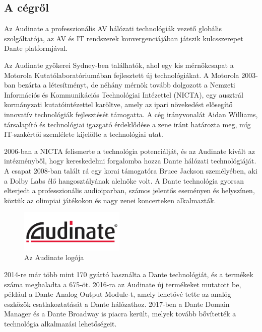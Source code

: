 \subsection{A cégről~\cite{AUDINATEHISTORY}} %
Az Audinate a professzionális AV hálózati technológiák vezető globális szolgáltatója, 
az AV és IT rendszerek konvergenciájában játszik kulcsszerepet Dante platformjával. 

Az Audinate gyökerei Sydney-ben találhatók, ahol egy kis mérnökcsapat a Motorola 
Kutatólaboratóriumában fejlesztett új technológiákat. A Motorola 2003-ban bezárta 
a létesítményt, de néhány mérnök tovább dolgozott a Nemzeti Információs és 
Kommunikációs Technológiai Intézettel (NICTA), egy ausztrál kormányzati kutatóintézettel 
karöltve, amely az ipari növekedést elősegítő innovatív technológiák fejlesztését támogatta. 
A cég irányvonalát Aidan Williams, társalapító és technológiai igazgató érdeklődése 
a zene iránt határozta meg, míg IT-szakértői szemlélete kijelölte a technológiai utat.

2006-ban a NICTA felismerte a technológia potenciálját, és az Audinate kivált az 
intézményből, hogy kereskedelmi forgalomba hozza Dante hálózati technológiáját. 
A csapat 2008-ban talált rá egy korai támogatóra Bruce Jackson személyében, aki 
a Dolby Labs élő hangosztályának alelnöke volt. A Dante technológia gyorsan 
elterjedt a professzionális audioiparban, számos jelentős eseményen és helyszínen, 
köztük az olimpiai játékokon és nagy zenei koncerteken alkalmazták.
\begin{figure}[H]
	\centering
	\includegraphics[width=50mm, keepaspectratio]{figures/audinate_logo.png}
	\caption{Az Audinate logója}
	\label {fig:audinate_logo}
\end{figure}
2014-re már több mint 170 gyártó használta a Dante technológiát, és a termékek 
száma meghaladta a 675-öt. 2016-ra az Audinate új termékeket mutatott be, például 
a Dante Analog Output Module-t, amely lehetővé tette az analóg eszközök 
csatlakoztatását a Dante hálózathoz. 2017-ben a Dante Domain Manager és a 
Dante Broadway is piacra került, melyek tovább bővítették a technológia alkalmazási lehetőségeit.

